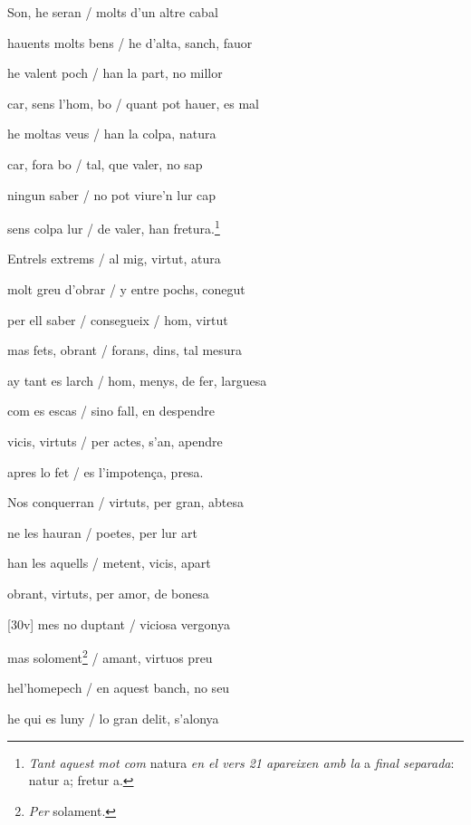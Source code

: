 \documentclass[12pt]{article}
\begin{document}
\begin{estrofa}

 Son, he seran / molts d'un altre cabal

 hauents molts bens / he d'alta, sanch, fauor

 he valent poch / han la part, no millor

 car, sens l'hom, bo / quant pot hauer, es mal

 he moltas veus / han la colpa, natura

 car, fora bo / tal, que valer, no sap

 ningun saber / no pot viure'n lur cap

 sens colpa lur / de valer, han fretura.\footnote{\textit{Tant aquest mot com
}natura\textit{ en el vers 21 apareixen amb la }a\textit{ final separada}: natur
a; fretur a.}

\end{estrofa}



\begin{estrofa}

 Entrels extrems / al mig, virtut, atura

 molt greu d'obrar / y entre pochs, conegut

 per ell saber / consegueix / hom, virtut

 mas fets, obrant / forans, dins, tal mesura

 ay tant es larch / hom, menys, de fer, larguesa

 com es escas / sino fall, en despendre

 vicis, virtuts / per actes, s'an, apendre

 apres lo fet / es l'impoten\c{c}a, presa.

\end{estrofa}



\begin{estrofa}

 Nos conquerran / virtuts, per gran, abtesa

 ne les hauran / poetes, per lur art

 han les aquells / metent, vicis, apart

 obrant, virtuts, per amor, de bonesa

 [30v] mes no duptant / viciosa vergonya

 mas soloment\footnote{\textit{Per} solament.} / amant, virtuos preu

 hel'homepech / en aquest banch, no seu

 he qui es luny / lo gran delit, s'alonya

\end{estrofa}
\end{document}
